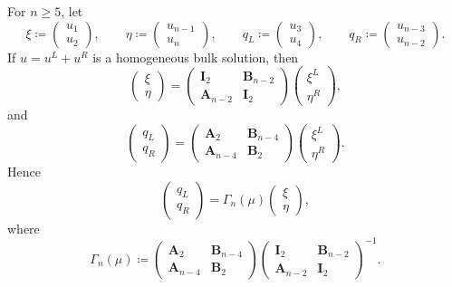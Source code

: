 \documentclass[11pt]{article}
\begin{document}
For \(n\ge 5\), let
\[
\xi\coloneqq
\begin{pmatrix}
u_1\\
u_2
\end{pmatrix},
\qquad
\eta\coloneqq
\begin{pmatrix}
u_{n-1}\\
u_n
\end{pmatrix},
\qquad
q_L\coloneqq
\begin{pmatrix}
u_3\\
u_4
\end{pmatrix},
\qquad
q_R\coloneqq
\begin{pmatrix}
u_{n-3}\\
u_{n-2}
\end{pmatrix}.
\]
If \(u=u^L+u^R\) is a homogeneous bulk solution, then
\[
\begin{pmatrix}\xi\\ \eta\end{pmatrix}
=
\begin{pmatrix}
\mathbf I_2 & \mathbf B_{n-2}\\
\mathbf A_{n-2} & \mathbf I_2
\end{pmatrix}
\begin{pmatrix}
\xi^L\\
\eta^R
\end{pmatrix},
\]
and
\[
\begin{pmatrix}
q_L\\
q_R
\end{pmatrix}
=
\begin{pmatrix}
\mathbf A_2 & \mathbf B_{n-4}\\
\mathbf A_{n-4} & \mathbf B_2
\end{pmatrix}
\begin{pmatrix}
\xi^L\\
\eta^R
\end{pmatrix}.
\]
Hence
\[
\begin{pmatrix}
q_L\\
q_R
\end{pmatrix}
=
\Gamma_n(\mu)
\begin{pmatrix}
\xi\\
\eta
\end{pmatrix},
\]
where
\[
\boxed{
\Gamma_n(\mu)\coloneqq
\begin{pmatrix}
\mathbf A_2 & \mathbf B_{n-4}\\
\mathbf A_{n-4} & \mathbf B_2
\end{pmatrix}
\begin{pmatrix}
\mathbf I_2 & \mathbf B_{n-2}\\
\mathbf A_{n-2} & \mathbf I_2
\end{pmatrix}^{-1}.
}
\]
\end{document}
